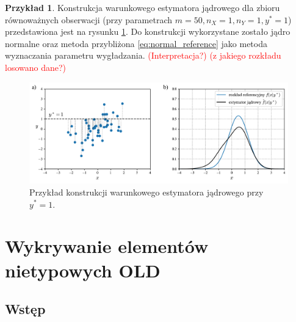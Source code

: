 \documentclass[12pt,a4paper,oneside]{book}
\theoremstyle{definition}
\newtheorem{exmp}{Przykład}[chapter]
\begin{document}
\begin{exmp}
Konstrukcja warunkowego estymatora jądrowego dla zbioru równoważnych obserwacji (przy parametrach $m=50, n_X=1, n_Y=1, y^*=1$) przedstawiona jest na rysunku \ref{fig:ckde_construction}. Do konstrukcji wykorzystane zostało jądro normalne oraz metoda przybliżona \eqref{eq:normal_reference} jako metoda wyznaczania parametru wygładzania. \textcolor{red}{(Interpretacja?) (z jakiego rozkładu losowano dane?)}

\begin{figure}[H]
    \centering
    \includegraphics[scale=0.6]{ckde_construction}
    \vspace{-0.5cm} 
    \caption{Przykład konstrukcji warunkowego estymatora jądrowego przy $y^*=1$.}
    \label{fig:ckde_construction}
\end{figure}
\end{exmp}

\chapter{Wykrywanie elementów nietypowych OLD}

\section{Wstęp}
\end{document}
